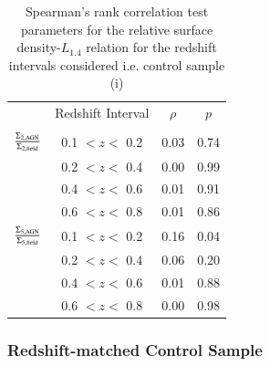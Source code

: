 \begin{table}
\begin{center}
 \caption[Spearman's rank correlation test for sample (i)]{Spearman's rank correlation test parameters for the relative surface density-$L_{1.4}$ relation for the redshift intervals considered i.e. control sample (i)}
 \label{table:correlation_parameters}
  \begin{tabular}{ c | c c c }
  \hline \hline
 & Redshift Interval & $\rho$ & $p$ \\
 & & & \\
\hline 
  $\frac{\Sigma_{2,{\rm AGN}}}{\Sigma_{2,{\rm field}}}$ 	& 0.1 $< z <$ 0.2 & 0.03 & 0.74	\\
   						& 0.2 $< z <$ 0.4 & 0.00 & 0.99	\\
   						& 0.4 $< z <$ 0.6 & 0.01 & 0.91	\\
   						& 0.6 $< z <$ 0.8 & 0.01 & 0.86	\\         
  \hline                                                                                            
  $\frac{\Sigma_{5,{\rm AGN}}}{\Sigma_{5,{\rm field}}}$ 	& 0.1 $< z <$ 0.2  & 0.16 & 0.04 \\
   						& 0.2 $< z <$ 0.4  & 0.06	& 0.20 \\     
  	 					& 0.4 $< z <$ 0.6  & 0.01 & 0.88  \\         
  						& 0.6 $< z <$ 0.8  & 0.00 & 0.98 	\\
  \hline
  \end{tabular}
 
 \end{center}
\end{table}

\subsubsection{Redshift-matched Control Sample}

